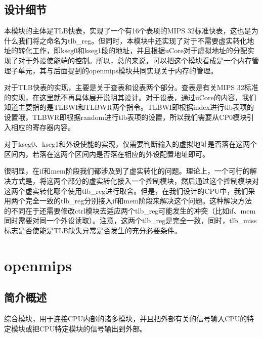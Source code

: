     \subsection{设计细节}
    本模块的主体是TLB快表，实现了一个有16个表项的MIPS 32标准快表，这也是为什么我们将之命名为tlb\_reg。但同时，本模块中还实现了对于不需要虚实转化地址的转化工作，即kseg0和kseg1段的地址，并且根据uCore对于虚拟地址的分配实现了对于外设使能端的控制。所以，总的来说，可以把这个模块看成是一个内存管理子单元，其与后面提到的openmips模块共同实现关于内存的管理。

    对于TLB快表的实现，主要是关于查表和设表两个部分。查表是有关MIPS 32标准的实现，在这里就不再具体展开说明其设计。对于设表，通过uCore的内容，我们知道主要指的是TLBWI和TLBWR两个指令。TLBWI即根据index进行tlb表项的设置哦，TLBWR即根据random进行tlb表项的设置，所以我们需要从CP0模块引入相应的寄存器内容。

    对于kseg0、kseg1和外设使能的实现，仅需要判断输入的虚拟地址是否落在这两个区间内，若落在这两个区间内是否落在相应的外设配置地址即可。

    很明显，在if和mem阶段我们都涉及到了虚实转化的问题。理论上，一个可行的解决方式是，将这两个部分的虚实转化接入一个控制模块，然后通过这个控制模块对这两个虚实转化哪个使用tlb\_reg进行取舍。但是，在我们设计的CPU中，我们采用两个完全一致的tlb\_reg分别接入if和mem阶段来解决这个问题。这种解决方法的不同在于还需要修改ctrl模块去适应两个tlb\_reg可能发生的冲突（比如if、mem同时需要对同一个外设读取）。注意，这两个tlb\_reg是完全一致，同时，tlb\_miss标志是否使能是TLB缺失异常是否发生的充分必要条件。
    
\section{openmips}

    \subsection{简介概述}
    综合模块，用于连接CPU内部的诸多模块，并且把外部有关的信号输入CPU的特定模块或把CPU特定模块的信号输出到外部。
    
